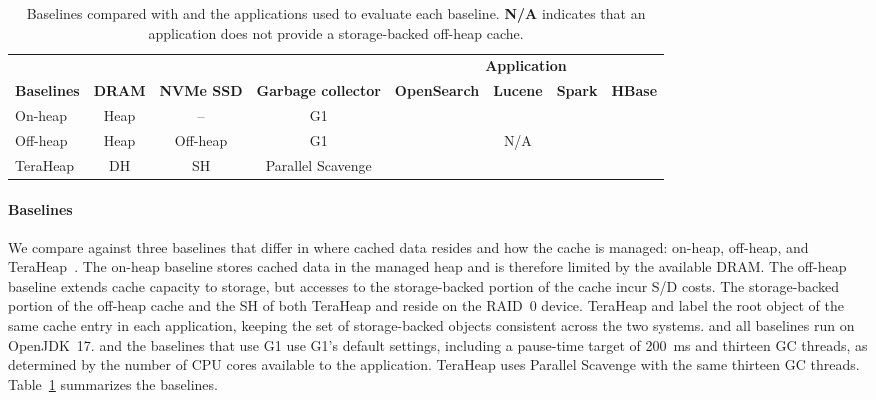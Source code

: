 \begin{table}[t]
	\small
	\caption{Baselines compared with \chipperName{} and the applications used to evaluate each baseline.
		\textbf{N/A} indicates that an application does not provide a storage-backed off-heap cache.}
	\label{tab:configs}
	\begin{tabular}{@{}lccc cccc@{}}
		\toprule
		                   &               &                   &                            & \multicolumn{4}{c}{\textbf{Application}}                                                     \\
		\cmidrule(l){5-8}
		\textbf{Baselines} & \textbf{DRAM} & \textbf{NVMe SSD} & \textbf{Garbage collector} & \textbf{OpenSearch}                      & \textbf{Lucene} & \textbf{Spark} & \textbf{HBase} \\
		\midrule
		On-heap            & Heap          & --                & G1                         & \checkmark                               & \checkmark      & \checkmark     & \checkmark     \\
		Off-heap           & Heap          & Off-heap          & G1                         & \checkmark                               & N/A             & \checkmark     & \checkmark     \\
		TeraHeap           & DH            & SH                & Parallel Scavenge          & \checkmark                               & \checkmark      & \checkmark     & \checkmark     \\
		\bottomrule
	\end{tabular}
\end{table}

\paragraph{\textbf{Baselines}}
We compare \chipperName{} against three baselines that differ in where cached data resides and how the cache is managed: on-heap, off-heap, and TeraHeap~\cite{teraheap}.
The on-heap baseline stores cached data in the managed heap and is therefore limited by the available DRAM.
The off-heap baseline extends cache capacity to storage, but accesses to the storage-backed portion of the cache incur S/D costs.
The storage-backed portion of the off-heap cache and the SH of both TeraHeap and \chipperName{} reside on the RAID~0 device.
TeraHeap and \chipperName{} label the root object of the same cache entry in each application, keeping the set of storage-backed objects consistent across the two systems.
\chipperName{} and all baselines run on OpenJDK~17.
\chipperName{} and the baselines that use G1 use G1's default settings, including a pause-time target of \SI{200}{ms} and thirteen GC threads, as determined by the number of CPU cores available to the application.
TeraHeap uses Parallel Scavenge with the same thirteen GC threads.
Table~\ref{tab:configs} summarizes the baselines.

